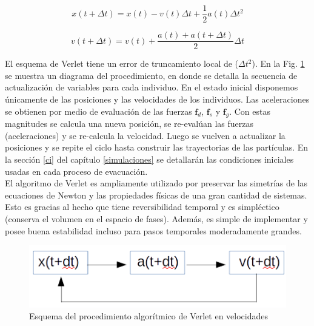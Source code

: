 \begin{equation}
x(t+\Delta t)=x(t)-v(t)\Delta t + \frac{1}{2}a(t)\Delta t^2 
\label{verlet_x}
\end{equation} 

\begin{equation}
v(t+\Delta t)=v(t)+\frac{a(t)+a(t+\Delta t)}{2}\Delta t
\label{verlet_v}
\end{equation}

El esquema de Verlet tiene un error de truncamiento local de ($\Delta t^2$). En la Fig. \ref{esquema_verlet} se muestra un diagrama del procedimiento, en donde se detalla la secuencia de actualización de variables para cada individuo. En el estado inicial disponemos únicamente de las posiciones y las velocidades de los individuos. Las aceleraciones se obtienen por medio de evaluación de las fuerzas $\mathbf{f}_d$, $\mathbf{f}_s$ y $\mathbf{f}_g$. Con estas magnitudes 
se calcula una nueva posición, se re-evalúan las fuerzas (aceleraciones) y se re-calcula la velocidad. Luego se vuelven a actualizar la posiciones y se repite el ciclo hasta construir las trayectorias de las partículas.
En la sección \ref{ci} del capítulo \ref{simulaciones} se detallarán las condiciones iniciales usadas en cada proceso de evacuación.\\

El algoritmo de Verlet es ampliamente utilizado por preservar las simetrías de las ecuaciones de Newton y las propiedades físicas de una gran cantidad de sistemas. Esto es gracias al hecho que tiene reversibilidad temporal y es simpléctico (conserva el volumen en el espacio de fases). Además, es simple de implementar y posee buena estabilidad incluso para pasos temporales moderadamente grandes.

\begin{figure}[H]
    \centering
        \includegraphics[scale=0.7]{figuras/esquema_verlet.png}
    \caption[width=5cm]{Esquema del procedimiento algorítmico de Verlet en velocidades}
    \label{esquema_verlet}
\end{figure}
